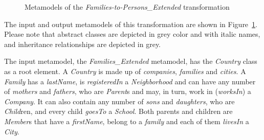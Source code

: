 \begin{figure}[bt]
\centering
{}
\caption{Metamodels of the \emph{Families-to-Persons\_Extended} transformation}\label{fig:metamodels}
\end{figure}

The input and output metamodels of this transformation are shown in Figure~\ref{fig:metamodels}. Please note that abstract classes are depicted in grey color and with italic names, and inheritance relationships are depicted in grey.

The input metamodel, the \emph{Families\_Extended} metamodel, has the \emph{Country} class as a root element.
A \emph{Country} is made up of \emph{companies}, \emph{families} and \emph{cities}.
A \emph{Family} has a \emph{lastName}, is \emph{registeredIn} a \emph{Neighborhood} and can have any number of \emph{mothers} and \emph{fathers}, who are \emph{Parent}s and may, in turn, work in (\emph{worksIn}) a \emph{Company}.
It can also contain any number of \emph{sons} and \emph{daughters}, who are \emph{Child}ren, and every child \emph{goesTo} a \emph{School}.
Both parents and children are \emph{Member}s that have a \emph{firstName}, belong to a \emph{family} and each of them \emph{livesIn} a \emph{City}.


